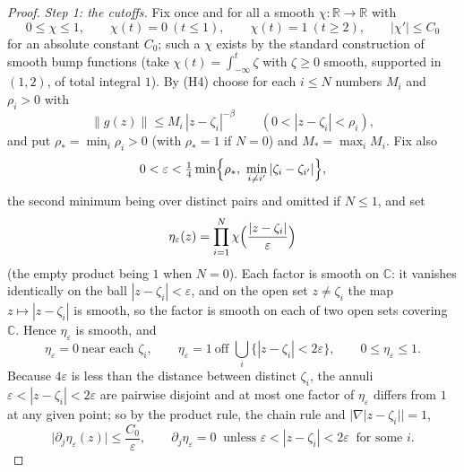 \begin{proof}
\emph{Step 1: the cutoffs.}  Fix once and for all a smooth
$\chi\colon\mathbb{R}\to\mathbb{R}$ with
\[
  0\le\chi\le1,\qquad \chi(t)=0\ (t\le1),\qquad \chi(t)=1\ (t\ge2),\qquad
  |\chi'|\le C_0
\]
for an absolute constant $C_0$; such a $\chi$ exists by the standard
construction of smooth bump functions (take $\chi(t)=\int_{-\infty}^{t}\zeta$
with $\zeta\ge0$ smooth, supported in $(1,2)$, of total integral $1$).  By
(H4) choose for each $i\le N$ numbers $M_i$ and $\rho_i>0$ with
\begin{equation}\tag{2}
  \|g(z)\|\le M_i\,|z-\zeta_i|^{-\beta}\qquad(0<|z-\zeta_i|<\rho_i),
\end{equation}
and put $\rho_*=\min_i\rho_i>0$ (with $\rho_*=1$ if $N=0$) and
$M_*=\max_iM_i$.  Fix also
\[
  0<\varepsilon<\tfrac14\min\Bigl\{\rho_*,\ \min_{i\neq i'}|\zeta_i-\zeta_{i'}|\Bigr\},
\]
the second minimum being over distinct pairs and omitted if $N\le1$, and set
\[
  \eta_\varepsilon(z)=\prod_{i=1}^{N}\chi\Bigl(\frac{|z-\zeta_i|}{\varepsilon}\Bigr)
\]
(the empty product being $1$ when $N=0$).  Each factor is smooth on
$\mathbb{C}$: it vanishes identically on the ball $|z-\zeta_i|<\varepsilon$, and
on the open set $z\neq\zeta_i$ the map $z\mapsto|z-\zeta_i|$ is smooth, so the
factor is smooth on each of two open sets covering $\mathbb{C}$.  Hence
$\eta_\varepsilon$ is smooth, and
\begin{equation}\tag{3}
  \eta_\varepsilon=0\ \text{near each }\zeta_i,\qquad
  \eta_\varepsilon=1\ \text{off }\textstyle\bigcup_i\{|z-\zeta_i|<2\varepsilon\},
  \qquad 0\le\eta_\varepsilon\le1 .
\end{equation}
Because $4\varepsilon$ is less than the distance between distinct $\zeta_i$, the
annuli $\varepsilon<|z-\zeta_i|<2\varepsilon$ are pairwise disjoint and at most
one factor of $\eta_\varepsilon$ differs from $1$ at any given point; so by the
product rule, the chain rule and $|\nabla|z-\zeta_i||=1$,
\begin{equation}\tag{4}
  \bigl|\partial_j\eta_\varepsilon(z)\bigr|\le\frac{C_0}{\varepsilon},
  \qquad
  \partial_j\eta_\varepsilon=0\ \text{ unless }
  \varepsilon<|z-\zeta_i|<2\varepsilon\ \text{ for some }i .
\end{equation}


\end{proof}
